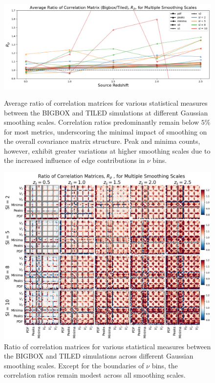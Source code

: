 \begin{figure}[p]
    \centering
    \includegraphics[width=\textwidth]{figures/results/avg_corr_ratio_sl.png}
    \caption[Average BIGBOX/TILED Ratio of Correlation for Multiple Smoothing Scales]
    {Average ratio of correlation matrices for various statistical measures between the BIGBOX and TILED simulations at different Gaussian smoothing scales. Correlation ratios predominantly remain below $5\%$ for most metrics, underscoring the minimal impact of smoothing on the overall covariance matrix structure. Peak and minima counts, however, exhibit greater variations at higher smoothing scales due to the increased influence of edge contributions in $\nu$ bins.}
    \label{fig:avg_corr_sl}
    \includegraphics[width=\textwidth]{figures/results/corr_smoothing.png}
    \caption[BIGBOX/TILED Ratio of Correlation for Multiple Smoothing Scales]
    {Ratio of correlation matrices for various statistical measures between the BIGBOX and TILED simulations across different Gaussian smoothing scales. Except for the boundaries of $\nu$ bins, the correlation ratios remain modest across all smoothing scales.} 
    \label{fig:corr_smoothing}
\end{figure}

